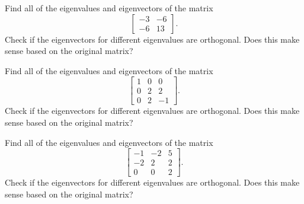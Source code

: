 \documentclass{ximera}
\begin{document}
\begin{exercise}
    Find all of the eigenvalues and eigenvectors of the matrix
    \[ 
        \begin{bmatrix}
            -3 & -6 \\ 
            -6 & 13 
        \end{bmatrix}. 
    \]
    Check if the eigenvectors for different eigenvalues are orthogonal. Does this make sense based on the original matrix?
\end{exercise}

\begin{exercise}%
    Find all of the eigenvalues and eigenvectors of the matrix
    \[ 
        \begin{bmatrix}
            1 & 0 & 0 \\ 
            0 & 2 & 2 \\ 
            0 & 2 & -1 
        \end{bmatrix}. 
    \]
    Check if the eigenvectors for different eigenvalues are orthogonal. Does this make sense based on the original matrix?
\end{exercise}

\begin{exercise}
    Find all of the eigenvalues and eigenvectors of the matrix
    \[ 
        \begin{bmatrix} 
            -1 & -2 & 5 \\ 
            -2 & 2 & 2 \\ 
            0 & 0 & 2 
        \end{bmatrix}. 
    \]
    Check if the eigenvectors for different eigenvalues are orthogonal. Does this make sense based on the original matrix?
\end{exercise}
\end{document}
